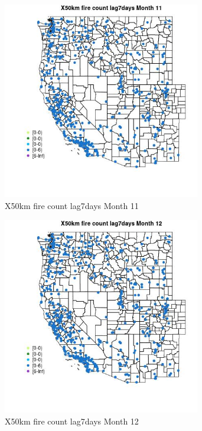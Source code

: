 \begin{figure} 
\centering  
\includegraphics[width=0.77\textwidth]{Code_Outputs/Report_ML_input_PM25_Step4_part_e_de_duplicated_aves_compiled_2019-05-14wNAs_MapObsMo11X50km_fire_count_lag7days.jpg} 
\caption{\label{fig:Report_ML_input_PM25_Step4_part_e_de_duplicated_aves_compiled_2019-05-14wNAsMapObsMo11X50km_fire_count_lag7days}X50km fire count lag7days Month 11} 
\end{figure} 
 

\begin{figure} 
\centering  
\includegraphics[width=0.77\textwidth]{Code_Outputs/Report_ML_input_PM25_Step4_part_e_de_duplicated_aves_compiled_2019-05-14wNAs_MapObsMo12X50km_fire_count_lag7days.jpg} 
\caption{\label{fig:Report_ML_input_PM25_Step4_part_e_de_duplicated_aves_compiled_2019-05-14wNAsMapObsMo12X50km_fire_count_lag7days}X50km fire count lag7days Month 12} 
\end{figure} 
 

